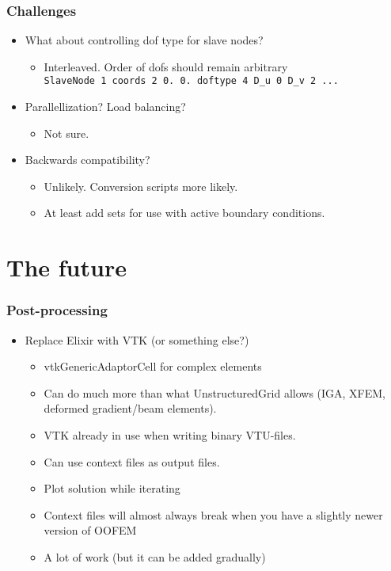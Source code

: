 \documentclass[11pt]{beamer} %
\begin{document}
\begin{frame}
 \frametitle{Challenges}
\begin{itemize}
 \item What about controlling dof type for slave nodes?
  \begin{itemize}
    \item Interleaved. Order of dofs should remain arbitrary\\
 \texttt{\footnotesize SlaveNode 1 coords 2 0. 0. doftype 4 D\_u 0 D\_v 2 ...}
  \end{itemize}
 \item Parallellization? Load balancing?
  \begin{itemize}
    \item Not sure.
  \end{itemize}
 \item Backwards compatibility?
  \begin{itemize}
    \item Unlikely. Conversion scripts more likely.
    \item At least add sets for use with active boundary conditions.
  \end{itemize}
\end{itemize}
\end{frame}

\section{The future}
\begin{frame}
 \frametitle{Post-processing}
 \begin{itemize}
  \item Replace Elixir with VTK (or something else?)
   \begin{itemize}
    \item[\smiley] vtkGenericAdaptorCell for complex elements
    \item[\smiley] Can do much more than what UnstructuredGrid allows (IGA, XFEM, deformed gradient/beam elements).
    \item[\smiley] VTK already in use when writing binary VTU-files.
    \item[\smiley] Can use context files as output files.
    \item[\smiley] Plot solution while iterating
    \item[\frownie] Context files will almost always break when you have a slightly newer version of OOFEM
    \item[\frownie] A lot of work (but it can be added gradually)
   \end{itemize}
 \end{itemize}
\end{frame}
\end{document}
